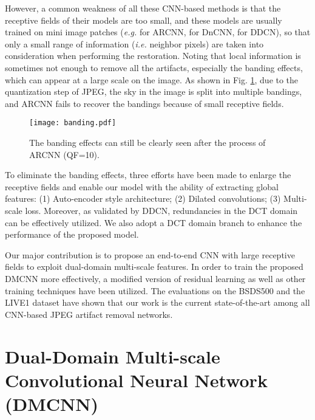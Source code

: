 \documentclass{article}
\begin{document}
However, a common weakness of all these CNN-based methods is that
the receptive fields of their models are too small, and these models are
usually trained on mini image patches (\textit{e.g.}  for ARCNN,
 for DnCNN,  for DDCN), so that only a
small range of information (\textit{i.e.} neighbor pixels) are
taken into consideration when performing the restoration. Noting that
local information is sometimes not enough to remove all the artifacts,
especially the banding effects, which can appear at a large scale on the image.
As shown in Fig. \ref{fig:f1}, due to the quantization step of JPEG,
the sky in the image is split into multiple bandings, and ARCNN fails to
recover the bandings because of small receptive fields.

\begin{figure}[htb]
  \begin{minipage}[b]{1.0\linewidth}
    \centering
    \centerline{\texttt{[image: banding.pdf]}}
\caption{The banding effects can still be clearly seen
    after the process of ARCNN (QF=10).}\medskip
    \label{fig:f1}
    \vspace{-0.5cm}
  \end{minipage}
\end{figure}

To eliminate the banding effects, three efforts have been made to
enlarge the receptive fields and enable our model with
the ability of extracting global features:
(1) Auto-encoder style architecture; (2) Dilated convolutions;
(3) Multi-scale loss. Moreover, as validated by DDCN, redundancies in
the DCT domain can be effectively utilized. We also adopt a DCT domain branch
to enhance the performance of the proposed model.

Our major contribution is to propose an end-to-end CNN with
large receptive fields to exploit dual-domain multi-scale features. In order to
train the proposed DMCNN more effectively, a modified version of
residual learning as well as other training techniques have been utilized.
The evaluations on the BSDS500 and the LIVE1 dataset have shown that our work
is the current state-of-the-art among all CNN-based JPEG artifact removal networks.
\vspace{-0.2cm}

\section{Dual-Domain Multi-scale
Convolutional Neural Network (DMCNN)}
\label{sec:model}
\vspace{-0.2cm}
   
\end{document}
